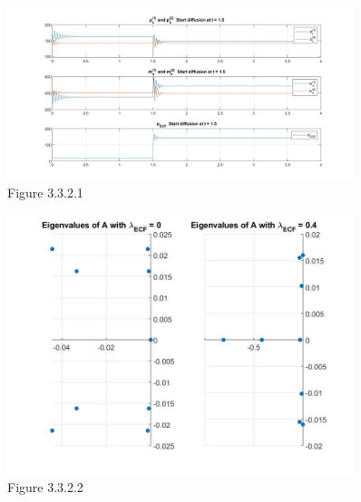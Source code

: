 \documentclass[12pt]{article}
\renewcommand{\(}{\left (}
\renewcommand{\)}{\right )}
\begin{document}
\newpage

\begin{figure}[h!]
    \centering
	\begin{minipage}{0.99\textwidth}
		\centering
		\includegraphics[width=0.9\textwidth]{SS.jpg}
		\caption*{\small Figure 3.3.2.1}
	\end{minipage}
\end{figure}

\begin{figure}[h!]
    \centering
	\begin{minipage}{0.99\textwidth}
		\centering
		\includegraphics[width=0.9\textwidth]{SSEi.jpg}
		\caption*{\small Figure 3.3.2.2}
	\end{minipage}
\end{figure}

\newpage
\end{document}
